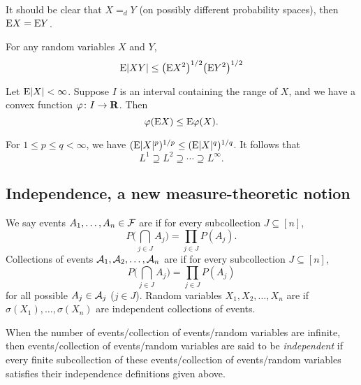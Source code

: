 It should be clear that $X =_d Y$ (on possibly different probability spaces), then $\mathop{}\!\mathrm{E} X = \mathop{}\!\mathrm{E} Y$.

\begin{namedthm} \label{thm:c-s-ineq-prob} For any random variables $X$ and $Y$, 
    \[\mathop{}\!\mathrm{E} \lvert XY \rvert \leq \bigl(\mathop{}\!\mathrm{E} X^2\bigr)^{1/2} \bigl(\mathop{}\!\mathrm{E} Y^2\bigr)^{1/2}\]
\end{namedthm}

\begin{namedthm} \label{thm:Jensen-prob}
    Let $\mathop{}\!\mathrm{E}\lvert X \rvert <\infty$. Suppose $I$ is an interval containing the range of $X$, and we have a convex function $\varphi\colon I\to \mathbf{R}$. Then \[
        \varphi(\mathop{}\!\mathrm{E} X) \leq \mathop{}\!\mathrm{E} \varphi(X).
    \]
\end{namedthm}
    
\begin{namedthm}
For $1 \leq p \leq q <\infty $, we have $(\mathop{}\!\mathrm{E}\lvert X \rvert^p)^{1/p} \leq (\mathop{}\!\mathrm{E} \lvert X \rvert^q)^{1/q}$. It follows that \[L^1 \supseteq L^2 \supseteq \dotsb \supseteq L^\infty.\]
\end{namedthm}

\subsection{Independence, a new measure-theoretic notion}

\begin{defn}
    We say events $A_1,\dotsc,A_n \in \mathcal{F}$ are  if for every subcollection $J \subseteq [n]$, \[
    P\biggl(\bigcap_{j\in J} A_j\biggr) = \prod_{j\in J} P(A_j).
\] %
Collections of events $\mathcal{A}_1,\mathcal{A}_2,\dotsc,\mathcal{A}_n$ are  if for every subcollection $J \subseteq [n]$, \[
    P\biggl(\bigcap_{j \in J} A_j\biggr) = \prod_{j\in J}P(A_j)
\] for all possible $A_j \in \mathcal{A}_j$ ($j \in J$).
Random variables $X_1,X_2,\dotsc,X_n$ are  if $\sigma(X_1),\dotsc,\sigma(X_n)$ are independent collections of events.

When the number of events/collection of events/random variables are infinite, then events/collection of events/random variables are said to be \emph{independent} if every finite subcollection of these events/collection of events/random variables satisfies their independence definitions given above.
\end{defn}

